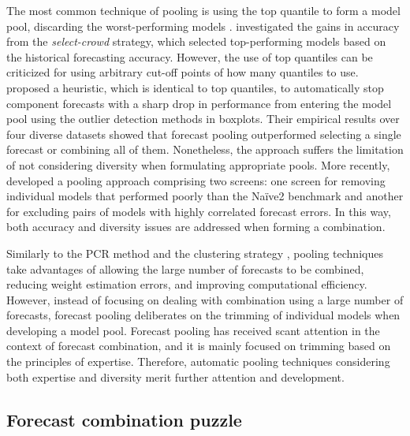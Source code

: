 \documentclass[11pt]{article}
\begin{document}
The most common technique of pooling is using the top quantile to form a model pool, discarding the worst-performing models \citep[e.g.,][]{Granger2004-sw}. \cite{Mannes2014-dl} investigated the gains in accuracy from the \textit{select-crowd} strategy, which selected top-performing models based on the historical forecasting accuracy. However, the use of top quantiles can be criticized for using arbitrary cut-off points of how many quantiles to use. \cite{Kourentzes2019-na} proposed a heuristic, which is identical to top quantiles, to automatically stop component forecasts with a sharp drop in performance from entering the model pool using the outlier detection methods in boxplots. Their empirical results over four diverse datasets showed that forecast pooling outperformed selecting a single forecast or combining all of them. Nonetheless, the approach suffers the limitation of not considering diversity when formulating appropriate pools. More recently, \cite{Lichtendahl2020-ut} developed a pooling approach comprising two screens: one screen for removing individual models that performed poorly than the Na\"{i}ve2 benchmark and another for excluding pairs of models with highly correlated forecast errors. In this way, both accuracy and diversity issues are addressed when forming a combination.

Similarly to the PCR method \citep{Stock2004-rq} and the clustering strategy \citep{Aiolfi2006-rh}, pooling techniques take advantages of allowing the large number of forecasts to be combined, reducing weight estimation errors, and improving computational efficiency. However, instead of focusing on dealing with combination using a large number of forecasts, forecast pooling deliberates on the trimming of individual models when developing a model pool. Forecast pooling has received scant attention in the context of forecast combination, and it is mainly focused on trimming based on the principles of expertise. Therefore, automatic pooling techniques considering both expertise and diversity merit further attention and development.

\subsection{Forecast combination puzzle}
\label{sec:forecast_combination_puzzle}
\end{document}
